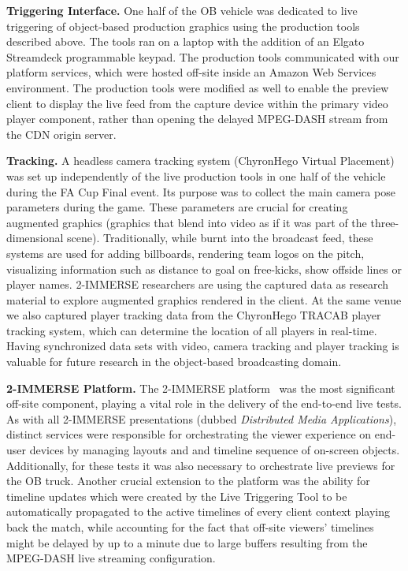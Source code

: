 \documentclass[sigchi-a, authorversion]{acmart}
\begin{document}
\vspace{5pt}\noindent\textbf{Triggering Interface.} One half of the OB vehicle was dedicated to live
triggering of object-based production graphics using the production tools
described above. The tools ran on a laptop with the addition of an Elgato
Streamdeck programmable keypad. The production tools communicated with our
platform services, which were hosted off-site inside an Amazon Web Services
environment. The production tools were modified as well to enable the preview
client to display the live feed from the capture device within the primary video
player component, rather than opening the delayed MPEG-DASH stream from the CDN
origin server.

\vspace{5pt}\noindent\textbf{Tracking.} A headless camera tracking system
(ChyronHego Virtual Placement) was set up independently of the live production
tools in one half of the vehicle during the FA Cup Final event. Its purpose was
to collect the main camera pose parameters during the game. These parameters
are crucial for creating augmented graphics (graphics that blend into video as if
it was part of the three-dimensional scene). Traditionally, while burnt into
the broadcast feed, these systems are used for adding billboards, rendering
team logos on the pitch, visualizing information such as distance to goal on
free-kicks, show offside lines or player names. 2-IMMERSE researchers are using the
captured data as research material to explore augmented graphics rendered in
the client. At the same venue we also captured player tracking data from the
ChyronHego TRACAB player tracking system, which can determine the location of all
players in real-time. Having synchronized data sets with video, camera
tracking and player tracking is valuable for future research in the object-based
broadcasting domain.

\vspace{5pt}\noindent\textbf{2-IMMERSE Platform.} The 2-IMMERSE
platform~\cite{jansen2018, kegel2017} was the most significant off-site
component, playing a vital role in the delivery of the end-to-end live
tests. As with all 2-IMMERSE presentations (dubbed \emph{Distributed Media
Applications}), distinct services were responsible for orchestrating the viewer experience on
end-user devices by managing layouts and and timeline sequence of on-screen objects.
Additionally, for these tests it was also necessary to orchestrate live previews for the OB truck.
Another crucial extension to the platform was the ability for timeline updates
which were created by the Live Triggering Tool to be automatically propagated to the active timelines of every client
context playing back the match, while accounting for the fact that off-site
viewers' timelines might be delayed by up to a minute due to large buffers
resulting from the MPEG-DASH live streaming configuration.
\end{document}
